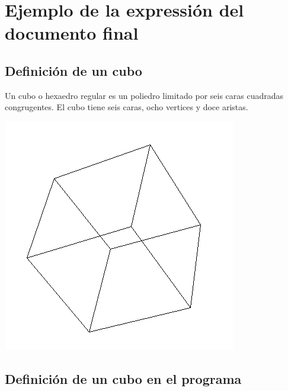 \documentclass{article}
\begin{document}
\newpage
\section{Ejemplo de la expressión del documento final}
\subsection{Definición de un cubo}
Un cubo o hexaedro regular es un poliedro limitado por seis caras cuadradas congrugentes. El cubo tiene seis caras, ocho vertices y doce aristas.

\begin{center}
  \includegraphics[scale=0.5]{img/cube.png}
\end{center}
\subsection{Definición de un cubo en el programa}
\end{document}
